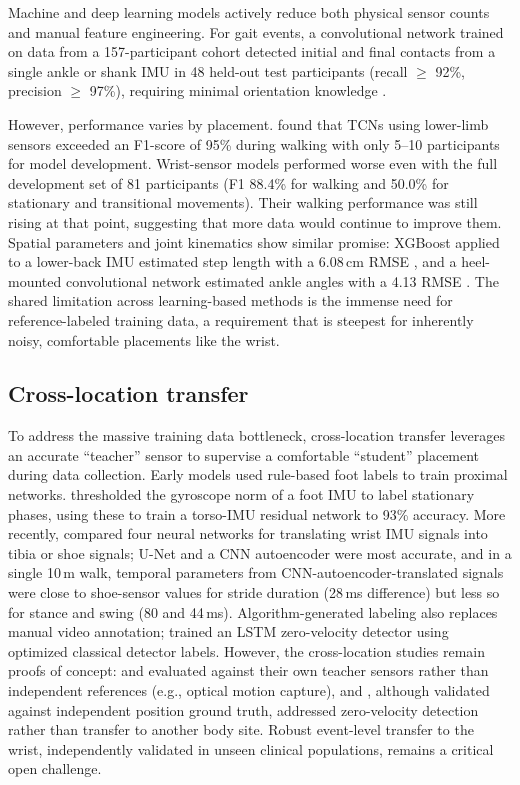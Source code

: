 \documentclass[10pt,a4paper,twocolumn]{article}
\begin{document}
Machine and deep learning models actively reduce both physical sensor counts and manual feature engineering. For gait events, a convolutional network trained on data from a 157-participant cohort detected initial and final contacts from a single ankle or shank IMU in 48 held-out test participants (recall $\geq$ 92\%, precision $\geq$ 97\%), requiring minimal orientation knowledge \citep{romijnders2022}.

However, performance varies by placement. \citet{anderson2025} found that TCNs using lower-limb sensors exceeded an F1-score of 95\% during walking with only 5--10 participants for model development. Wrist-sensor models performed worse even with the full development set of 81 participants (F1 88.4\% for walking and 50.0\% for stationary and transitional movements). Their walking performance was still rising at that point, suggesting that more data would continue to improve them. Spatial parameters and joint kinematics show similar promise: XGBoost applied to a lower-back IMU estimated step length with a 6.08\,cm RMSE \citep{zadka2024}, and a heel-mounted convolutional network estimated ankle angles with a 4.13\textdegree{} RMSE \citep{wang2025l}. The shared limitation across learning-based methods is the immense need for reference-labeled training data, a requirement that is steepest for inherently noisy, comfortable placements like the wrist.

\subsection{Cross-location transfer}

To address the massive training data bottleneck, cross-location transfer leverages an accurate ``teacher'' sensor to supervise a comfortable ``student'' placement during data collection. Early models used rule-based foot labels to train proximal networks. \citet{koroglu2018} thresholded the gyroscope norm of a foot IMU to label stationary phases, using these to train a torso-IMU residual network to 93\% accuracy. More recently, \citet{kolakowski2024} compared four neural networks for translating wrist IMU signals into tibia or shoe signals; U-Net and a CNN autoencoder were most accurate, and in a single 10\,m walk, temporal parameters from CNN-autoencoder-translated signals were close to shoe-sensor values for stride duration (28\,ms difference) but less so for stance and swing (80 and 44\,ms). Algorithm-generated labeling also replaces manual video annotation; \citet{wagstaff2020} trained an LSTM zero-velocity detector using optimized classical detector labels. However, the cross-location studies remain proofs of concept: \citet{koroglu2018} and \citet{kolakowski2024} evaluated against their own teacher sensors rather than independent references (e.g., optical motion capture), and \citet{wagstaff2020}, although validated against independent position ground truth, addressed zero-velocity detection rather than transfer to another body site. Robust event-level transfer to the wrist, independently validated in unseen clinical populations, remains a critical open challenge.
\end{document}
